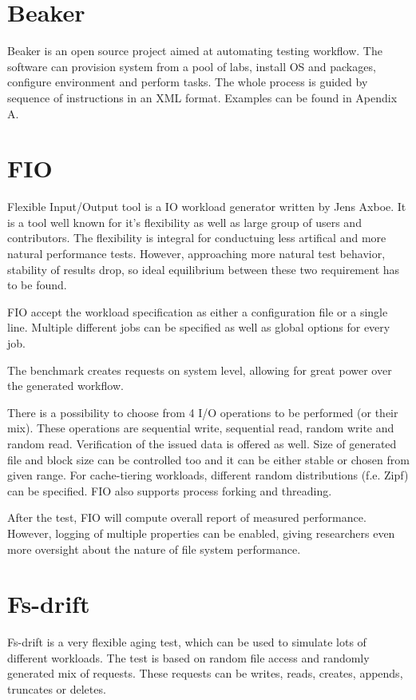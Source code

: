 \documentclass[
  color, %
  table, %
  lof,   %
  lot,   %
]{fithesis3}
\begin{document}
\section{Beaker}
Beaker is an open source project aimed at automating testing workflow. The software can provision system from a pool of labs, install OS and packages, configure environment and perform tasks. The whole process is guided by sequence of instructions in an XML format. Examples can be found in Apendix A.





\section{FIO}
Flexible Input/Output tool is a IO workload generator written by Jens Axboe. It is a tool well known for it's flexibility as well as large group of users and contributors. The flexibility is integral for conductuing less artifical and more natural performance tests. However, approaching more natural test behavior, stability of results drop, so ideal equilibrium between these two requirement has to be found.

FIO accept the workload specification as either a configuration file or a single line. Multiple different jobs can be specified as well as global options for every job. 

The benchmark creates requests on system level, allowing for great power over the generated workflow.

There is a possibility to choose from 4 I/O operations to be performed (or their mix). These operations are sequential write, sequential read, random write and random read. Verification of the issued data is offered as well. Size of generated file and block size can be controlled too and it can be either stable or chosen from given range. For cache-tiering workloads, different random distributions (f.e. Zipf) can be specified. FIO also supports process forking and threading.

After the test, FIO will compute overall report of measured performance. However, logging of multiple properties can be enabled, giving researchers even more oversight about the nature of file system performance.

\section{Fs-drift}
Fs-drift is a very flexible aging test, which can be used to simulate lots of different workloads. The test is based on random file access and randomly generated mix of requests. These requests can be writes, reads, creates, appends, truncates or deletes.
\end{document}
